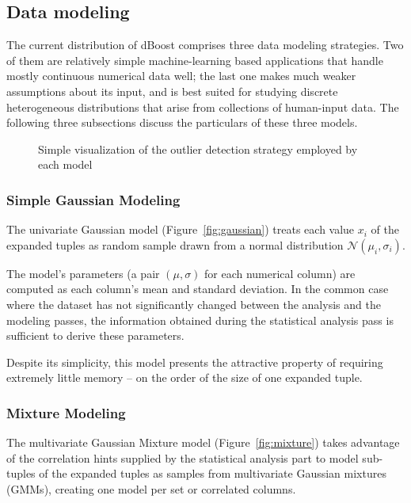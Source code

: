 \subsection{Data modeling}
\label{sec:model-creation}

The current distribution of dBoost comprises three data modeling strategies. Two of them are relatively simple machine-learning based applications that handle mostly continuous numerical data well; the last one makes much weaker assumptions about its input, and is best suited for studying discrete heterogeneous distributions that arise from collections of human-input data. The following three subsections discuss the particulars of these three models.


\begin{figure}%
  \centering
  \newcommand{\cramped}[4]{\subfloat[#3]{\texttt{[image: \#2]}\label{fig:#4}}}
  \cramped{1}{../graphics/models-plots-crop.pdf}{Gaussian}{gaussian}\hspace*{.01\linewidth}
  \cramped{2}{../graphics/models-plots-crop.pdf}{Mixture}{mixture}\hspace*{.01\linewidth}
  \cramped{3}{../graphics/models-plots-crop.pdf}{Histogram}{histogram}
  \caption{Simple visualization of the outlier detection strategy employed by each model}
  \label{fig:models}
\end{figure}

\subsubsection{Simple Gaussian Modeling}
\label{sec:gaus_model}
The univariate Gaussian model (Figure~\ref{fig:gaussian}) treats each value $x_i$ of the expanded tuples as random sample drawn from a normal distribution $\mathcal N(\mu_i, \sigma_i)$.

The model's parameters (a pair $(\mu, \sigma)$ for each numerical column) are computed as each column's mean and standard deviation. In the common case where the dataset has not significantly changed between the analysis and the modeling passes, the information obtained during the statistical analysis pass is sufficient to derive these parameters.

Despite its simplicity, this model presents the attractive property of requiring extremely little memory -- on the order of the size of one expanded tuple.

\subsubsection{Mixture Modeling}
The multivariate Gaussian Mixture model (Figure~\ref{fig:mixture}) takes advantage of the correlation hints supplied by the statistical analysis part to model sub-tuples of the expanded tuples as samples from multivariate Gaussian mixtures (GMMs), creating one model per set or correlated columns.

